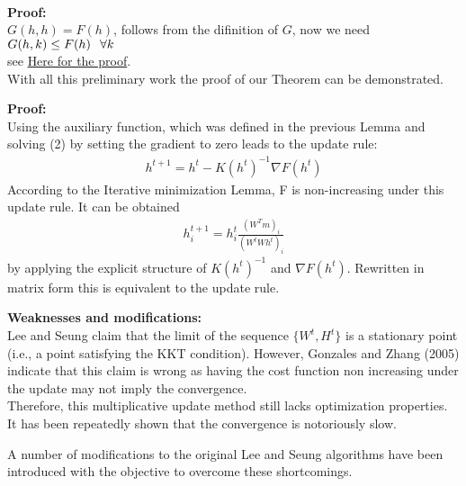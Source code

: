 \documentclass{beamer}
\begin{document}
\begin{spacing}{1.0}
\begin{frame}
\begin{lemma}
\begin{align}
        \end{align}
    \end{lemma}
\end{frame}
\begin{frame}
    \textbf{Proof:}\\
    $G(h, h) = F(h)$, follows from the difinition of $G$, now we need $G(h,k) \leq F(h) \hspace{0.1in} \forall k$\\
    see \href{https://proceedings.neurips.cc/paper/2000/file/f9d1152547c0bde01830b7e8bd60024c-Paper.pdf}
    {Here for the proof}.\\
    With all this preliminary work the proof of our Theorem  can be demonstrated.
\end{frame}
\begin{frame}
        \textbf{Proof:}\\
        Using the auxiliary function, which was defined in the previous Lemma and solving (2)
        by setting the gradient to zero leads to the update rule:
        \begin{align*}
            h^{t+1} = h^{t} - K(h^{t})^{-1}\nabla F(h^{t})
        \end{align*}
        According to the Iterative minimization Lemma, F is non-increasing under this update
        rule. It can be obtained
        \begin{align*}
            h^{t+1}_{i} = h^{t}_{i}\frac{(W^{T}m)_{i}}{(W^{t}Wh^{t})_{i}}
        \end{align*}
        by applying the explicit structure of $K(h^{t})^{-1}$ and $\nabla F(h^{t})$. Rewritten
        in matrix form this is equivalent to the update rule.
\end{frame}
\begin{frame}
    \textbf{Weaknesses and modifications:}\\
    Lee and Seung claim that the limit of the sequence $\{W^{t}, H^{t}\}$ is a 
    stationary point (i.e., a point satisfying the KKT condition). However, Gonzales and Zhang (2005)
    indicate that this claim is wrong as having  the cost function non increasing under the update 
    may not imply the convergence.\\
    Therefore, this multiplicative update method still lacks optimization properties.\\
    It has been repeatedly shown that the convergence is notoriously slow.
    
    A number of modifications to the original Lee and Seung algorithms have been
    introduced with the objective to overcome these shortcomings.\\


\end{frame}
\end{spacing}
\end{document}
